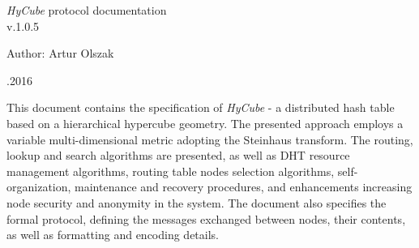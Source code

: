 \documentclass[a4paper,onecolumn,oneside,12pt]{mwrep}
\begin{document}
\begin{titlepage}	%
	
	\fontsize{24pt}{18pt}\selectfont
	\emph{HyCube} protocol documentation \\
	
	\fontsize{16pt}{14pt}\selectfont
	v.1.0.5
	\vspace*{25\baselineskip}
	
	
	\fontsize{14pt}{15pt}\selectfont
	Author: Artur Olszak\\
	\vspace*{1\baselineskip}
	
	
	\begin{flushright}
	\fontsize{10pt}{15pt}.2016
	\end{flushright}
	
\end{titlepage}


\newpage

\newpage
{}


This document contains the specification of \emph{HyCube} - a distributed hash table based on a hierarchical hypercube geometry. The presented approach employs a variable multi-dimensional metric adopting the Steinhaus transform. The routing, lookup and search algorithms are presented, as well as DHT resource management algorithms, routing table nodes selection algorithms, self-organization, maintenance and recovery procedures, and enhancements increasing node security and anonymity in the system. The document also specifies the formal protocol, defining the messages exchanged between nodes, their contents, as well as formatting and encoding details.



\newpage


\setcounter{page}{3}



\tableofcontents


















\nocite{*}





\end{document}
